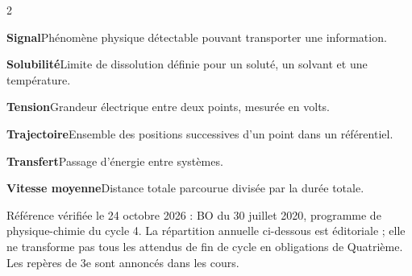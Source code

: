 \begin{multicols}{2}
\par\addvspace{2mm}\noindent\begin{minipage}{\linewidth}\textbf{Signal}\enspace Phénomène physique détectable pouvant transporter une information.\par\end{minipage}\par
\par\addvspace{2mm}\noindent\begin{minipage}{\linewidth}\textbf{Solubilité}\enspace Limite de dissolution définie pour un soluté, un solvant et une température.\par\end{minipage}\par
\par\addvspace{2mm}\noindent\begin{minipage}{\linewidth}\textbf{Tension}\enspace Grandeur électrique entre deux points, mesurée en volts.\par\end{minipage}\par
\par\addvspace{2mm}\noindent\begin{minipage}{\linewidth}\textbf{Trajectoire}\enspace Ensemble des positions successives d’un point dans un référentiel.\par\end{minipage}\par
\par\addvspace{2mm}\noindent\begin{minipage}{\linewidth}\textbf{Transfert}\enspace Passage d’énergie entre systèmes.\par\end{minipage}\par
\par\addvspace{2mm}\noindent\begin{minipage}{\linewidth}\textbf{Vitesse moyenne}\enspace Distance totale parcourue divisée par la durée totale.\par\end{minipage}\par
\end{multicols}\endgroup
{}
\label{programme}
Référence vérifiée le 24 octobre 2026 : BO du 30 juillet 2020, programme de physique-chimie du cycle 4. La répartition annuelle ci-dessous est éditoriale ; elle ne transforme pas tous les attendus de fin de cycle en obligations de Quatrième. Les repères de 3e sont annoncés dans les cours.\par\vspace{3mm}
